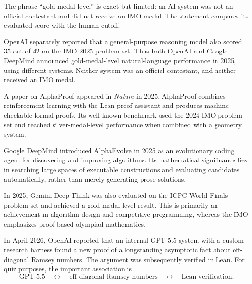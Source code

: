     \begin{remark}
        The phrase ``gold-medal-level'' is exact but limited: an AI system was not
        an official contestant and did not receive an IMO medal. The statement
        compares its evaluated score with the human cutoff.
    \end{remark}

    \begin{fact}
        OpenAI separately reported that a general-purpose reasoning model also
        scored $35$ out of $42$ on the IMO 2025 problem set. Thus both OpenAI and
        Google DeepMind announced gold-medal-level natural-language performance
        in 2025, using different systems. Neither system was an official
        contestant, and neither received an IMO medal.
    \end{fact}

    \begin{fact}
        A paper on AlphaProof appeared in \textit{Nature} in 2025. AlphaProof
        combines reinforcement learning with the Lean proof assistant and
        produces machine-checkable formal proofs. Its well-known benchmark used
        the 2024 IMO problem set and reached silver-medal-level performance when
        combined with a geometry system.
    \end{fact}

    \begin{fact}[AlphaEvolve]
        Google DeepMind introduced AlphaEvolve in 2025 as an evolutionary coding
        agent for discovering and improving algorithms. Its mathematical
        significance lies in searching large spaces of executable constructions
        and evaluating candidates automatically, rather than merely generating
        prose solutions.
    \end{fact}

    \begin{fact}
        In 2025, Gemini Deep Think was also evaluated on the ICPC World Finals
        problem set and achieved a gold-medal-level result. This is primarily an
        achievement in algorithm design and competitive programming, whereas the
        IMO emphasizes proof-based olympiad mathematics.
    \end{fact}

    \begin{fact}
        In April 2026, OpenAI reported that an internal GPT-5.5 system with a
        custom research harness found a new proof of a longstanding asymptotic
        fact about off-diagonal Ramsey numbers. The argument was subsequently
        verified in Lean. For quiz purposes, the important association is
        \[
            \text{GPT-5.5}
            \quad\longleftrightarrow\quad
            \text{off-diagonal Ramsey numbers}
            \quad\longleftrightarrow\quad
            \text{Lean verification}.
        \]
    \end{fact}

